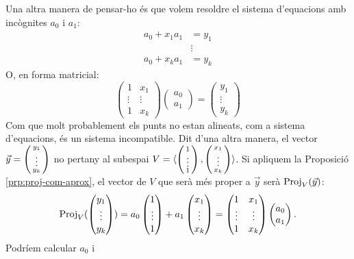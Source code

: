 \documentclass[
  11pt,
]{book}
\numberwithin{dummy}{section}
\theoremstyle{maincolornumbox}
\theoremstyle{blacknumex}
\theoremstyle{blacknumbox}
\theoremstyle{maincolornum}
\newlength\esp
\begin{document}
Una altra manera de pensar-ho és que volem resoldre el sistema
d'equacions amb incògnites \(a_0\) i \(a_1\): \begin{align*}
a_ 0 + x_1 a_1 & = y_1 \\ & \vdots  \\ a_0 + x_k a_1 & = y_k 
\end{align*} O, en forma matricial:
\[\begin{pmatrix} 1 & x_1 \\ \vdots & \vdots \\ 1 & x_k \end{pmatrix}
\begin{pmatrix} a_0 \\ a_1 \end{pmatrix} =
\begin{pmatrix} y_1 \\ \vdots \\ y_k \end{pmatrix}\] Com que molt
probablement els punts no estan alineats, com a sistema d'equacions, és
un sistema incompatible. Dit d'una altra manera, el vector
\(\vec y=\left(\begin{smallmatrix}y_1 \\ \vdots \\ y_k\end{smallmatrix}\right)\) no pertany al subespai
\(V=\langle \left(\begin{smallmatrix}1 \\ \vdots \\ 1\end{smallmatrix}\right) , \left(\begin{smallmatrix}x_1 \\ \vdots \\ x_k\end{smallmatrix}\right) \rangle\).
Si apliquem la Proposició
\ref{prp:proj-com-aprox}, el vector de \(V\) que serà més proper a
\(\vec y\) serà \(\operatorname{Proj}_V(\vec y)\):
\[\operatorname{Proj}_V(\begin{pmatrix} y_1 \\ \vdots \\ y_k \end{pmatrix})= a_0 \begin{pmatrix} 1 \\ \vdots \\ 1 \end{pmatrix} + a_1 \begin{pmatrix} x_1 \\ \vdots \\ x_k \end{pmatrix}= \begin{pmatrix} 1 & x_1 \\ \vdots & \vdots \\ 1 & x_k \end{pmatrix}
\begin{pmatrix} a_0 \\ a_1 \end{pmatrix} .\] Podríem calcular \(a_0\) i
\end{document}
